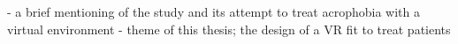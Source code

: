 

- a brief mentioning of the study and its attempt to treat acrophobia with a virtual environment
- theme of this thesis; the design of a VR fit to treat patients